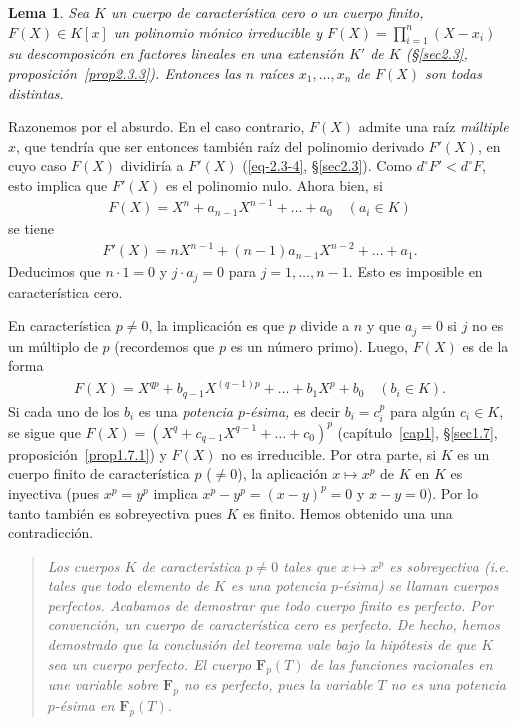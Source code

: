\documentclass[bibtotoc,leqno,spanish]{amsbook}
\newcommand{\FF}{\mathbf{F}}
\numberwithin{equation}{section}
\newenvironment{comm}%
	{\begin{quotation}\itshape}
	{\end{quotation}}
\theoremstyle{note}
\theoremstyle{note}
\newtheorem*{lemma*}{Lema}
\theoremstyle{rem}
\numberwithin{theorem}{section}
\numberwithin{proposition}{section}
\numberwithin{definition}{section}
\numberwithin{lemma}{section}
\numberwithin{corollary}{section}
\numberwithin{example}{section}
\numberwithin{footnote}{section}%
\begin{document}
\begin{lemma*}
Sea $K$ un cuerpo de caracter\'istica cero o un cuerpo finito, $F(X)\in K[x]$ un polinomio m\'onico
irreducible y $F(X) = \prod_{i=1}^{n}(X-x_{i})$ su descomposic\'on en factores lineales en una extensi\'on
$K'$ de $K$ (\S\ref{sec2.3}, proposici\'on~\ref{prop2.3.3}). Entonces
las $n$ ra\'ices $x_{1},\dots,x_{n}$ de $F(X)$ son todas distintas.
\end{lemma*}

Razonemos por el absurdo. En el caso contrario, $F(X)$ admite una ra\'iz \emph{m\'ultiple} $x$, que
tendr\'ia que ser entonces tambi\'en ra\'iz del polinomio derivado $F'(X)$, en cuyo caso $F(X)$
dividir\'ia a $F'(X)$ (\eqref{eq-2.3-4}, \S\ref{sec2.3}). Como $d^{\circ}F' < d^{\circ}F$, esto implica que $F'(X)$ es el
polinomio nulo. Ahora bien, si
\begin{gather*}
F(X) = X^{n}+a_{n-1}X^{n-1}+\dots+a_{0}\quad(a_{i}\in K)
\end{gather*}
se tiene
\begin{gather*}
F'(X) = nX^{n-1}+(n-1)a_{n-1}X^{n-2}+\dots+a_{1}.
\end{gather*}
Deducimos que $n\cdot 1 = 0$ y $j\cdot a_{j} = 0$ para $j=1,\dots,n-1$. Esto es imposible en caracter\'istica
cero.

En caracter\'istica $p\neq 0$, la implicaci\'on es que $p$ divide a $n$ y que $a_{j} = 0$ si $j$ no es
un m\'ultiplo de $p$ (recordemos que $p$ es un n\'umero primo). Luego, $F(X)$ es de la forma
\begin{gather*}
F(X) = X^{qp}+b_{q-1}X^{(q-1)p}+\dots+b_{1}X^{p}+b_{0}\quad(b_{i}\in K).
\end{gather*}
Si cada uno de los $b_{i}$ es una \emph{potencia $p$-\'esima,} es decir $b_{i} = c_{i}^{p}$ para
alg\'un $c_{i}\in K$, se sigue que $F(X) = (X^{q}+c_{q-1}X^{q-1}+\dots+c_{0})^{p}$ (cap\'itulo~\ref{cap1}, \S\ref{sec1.7},
proposici\'on~\ref{prop1.7.1}) y $F(X)$ no es irreducible. Por otra parte, si $K$ es un cuerpo finito de caracter\'istica $p$
($\neq 0$), la aplicaci\'on $x\mapsto x^{p}$ de $K$ en $K$ es inyectiva (pues
$x^{p}=y^{p}$ implica $x^{p}-y^{p} = (x-y)^{p} = 0$ y $x-y=0$). Por lo tanto tambi\'en es sobreyectiva
pues $K$ es finito. Hemos obtenido una una contradicci\'on.

\begin{comm}
Los cuerpos $K$ de caracter\'istica $p\neq 0$ tales que $x\mapsto x^{p}$ es sobreyectiva
(i.e. tales que todo elemento de $K$ es una potencia $p$-\'esima) se llaman cuerpos \emph{perfectos.}
Acabamos de demostrar que todo cuerpo finito es perfecto. Por convenci\'on, un cuerpo de caracter\'istica
cero es perfecto. De hecho, hemos demostrado que la conclusi\'on del teorema vale bajo la hip\'otesis
de que $K$ sea un cuerpo perfecto. El cuerpo $\FF_{p}(T)$ de las funciones racionales en une variable
sobre $\FF_{p}$ no es perfecto, pues la variable $T$ no es una potencia $p$-\'esima en $\FF_{p}(T)$.
\end{comm}
\end{document}
